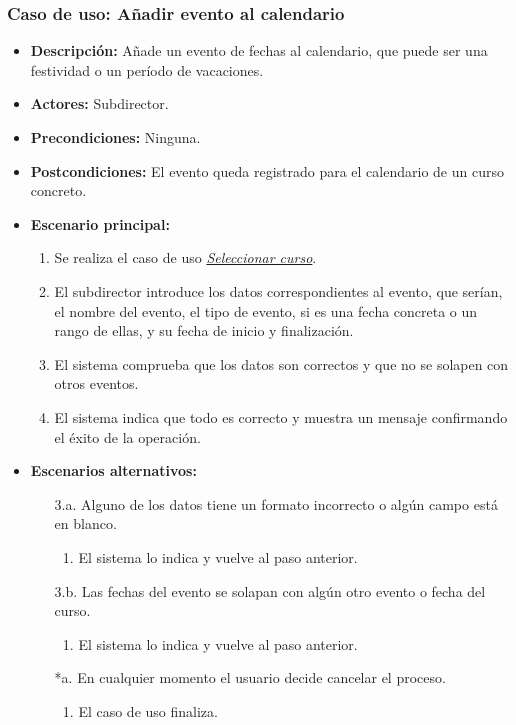 \documentclass{book}
\begin{document}
\subsubsection*{Caso de uso: Añadir evento al calendario}
\begin{itemize}
\item{\bf Descripción:} Añade un evento de fechas al calendario, que puede ser una festividad o un período de vacaciones.
\item{\bf Actores:} Subdirector.
\item{\bf Precondiciones:} Ninguna.
\item{\bf Postcondiciones:} El evento queda registrado para el calendario de un curso concreto.
\item{\bf Escenario principal:}
	\begin{enumerate}
	\item Se realiza el caso de uso {\em \hyperref[select_curso]{Seleccionar curso}}.
	\item El subdirector introduce los datos correspondientes al evento, que serían, el nombre del evento, el tipo de evento, si es una fecha concreta o un rango de ellas, y su fecha de inicio y finalización.
	\item El sistema comprueba que los datos son correctos y que no se solapen con otros eventos.
	\item El sistema indica que todo es correcto y muestra un mensaje confirmando el éxito de la operación.
	\end{enumerate}
\item{\bf Escenarios alternativos:}
	\begin{itemize}
		\item[3.a.] Alguno de los datos tiene un formato incorrecto o algún campo está en blanco.
		\begin{enumerate}
			\item El sistema lo indica y vuelve al paso anterior.
		\end{enumerate}
		\item[3.b.] Las fechas del evento se solapan con algún otro evento o fecha del curso.
		\begin{enumerate}
			\item El sistema lo indica y vuelve al paso anterior.
		\end{enumerate}
		\item[*a.] En cualquier momento el usuario decide cancelar el proceso.
		\begin{enumerate}
		\item El caso de uso finaliza.
		\end{enumerate}
	\end{itemize}
\end{itemize}
\end{document}
